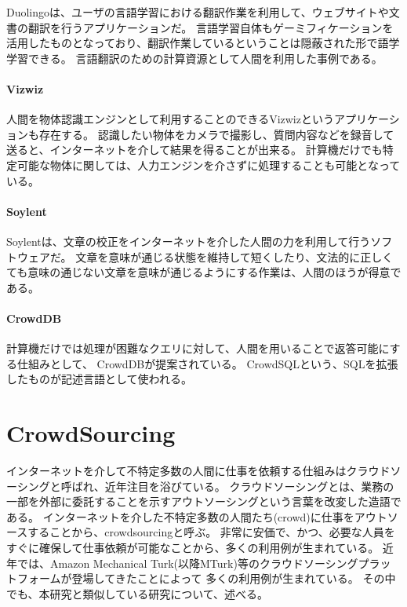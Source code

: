 \mbox{}

Duolingo\cite{duolingo}は、ユーザの言語学習における翻訳作業を利用して、ウェブサイトや文書の翻訳を行うアプリケーションだ。
言語学習自体もゲーミフィケーションを活用したものとなっており、翻訳作業しているということは隠蔽された形で語学学習できる。
言語翻訳のための計算資源として人間を利用した事例である。

\paragraph{Vizwiz}\label{vizwiz}

\mbox{}

人間を物体認識エンジンとして利用することのできるVizwiz\cite{vizwiz}というアプリケーションも存在する。
認識したい物体をカメラで撮影し、質問内容などを録音して送ると、インターネットを介して結果を得ることが出来る。
計算機だけでも特定可能な物体に関しては、人力エンジンを介さずに処理することも可能となっている。

\paragraph{Soylent}\label{soylent}

\mbox{}

Soylent\cite{soylent}は、文章の校正をインターネットを介した人間の力を利用して行うソフトウェアだ。
文章を意味が通じる状態を維持して短くしたり、文法的に正しくても意味の通じない文章を意味が通じるようにする作業は、人間のほうが得意である。

\paragraph{CrowdDB}\label{crowddb}

\mbox{}

計算機だけでは処理が困難なクエリに対して、人間を用いることで返答可能にする仕組みとして、
CrowdDB\cite{crowddb}が提案されている。
CrowdSQLという、SQLを拡張したものが記述言語として使われる。

\section{CrowdSourcing}\label{crowdsourcing}

インターネットを介して不特定多数の人間に仕事を依頼する仕組みはクラウドソーシングと呼ばれ、近年注目を浴びている。
クラウドソーシングとは、業務の一部を外部に委託することを示すアウトソーシングという言葉を改変した造語である\cite{riseofcrowdsourcing}。
インターネットを介した不特定多数の人間たち(crowd)に仕事をアウトソースすることから、crowdsourcingと呼ぶ。
非常に安価で、かつ、必要な人員をすぐに確保して仕事依頼が可能なことから、多くの利用例が生まれている。
近年では、Amazon Mechanical
Turk\cite{amt}(以降MTurk)等のクラウドソーシングプラットフォームが登場してきたことによって
多くの利用例が生まれている。
その中でも、本研究と類似している研究について、述べる。

